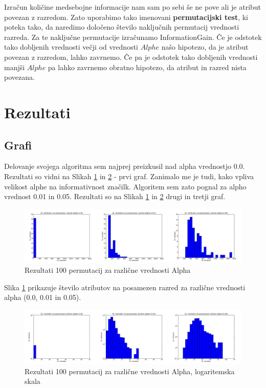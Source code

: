 \documentclass[a4paper,11pt]{article}
\begin{document}
Izračun količine medsebojne informacije nam sam po sebi še ne pove ali je atribut povezan z razredom. Zato uporabimo tako imenovani \textbf{permutacijski test}, ki poteka tako, da naredimo določeno število naključnih permutacij vrednosti razreda. Za te naključne permutacije izračunamo InformationGain. Če je odstotek tako dobljenih vrednosti večji od vrednosti $Alphe$ našo hipotezo, da je atribut povezan z razredom, lahko zavrnemo. Če pa je odstotek tako dobljenih vrednosti manjši $Alphe$ pa lahko zavrnemo obratno hipotezo, da atribut in razred nista povezana. 
\section{Rezultati}
\subsection{Grafi}

Delovanje svojega algoritma sem najprej preizkusil nad alpha vrednostjo 0.0. Rezultati so vidni na Slikah \ref{skupno100} in \ref{skupno100a} - prvi graf. Zanimalo me je tudi, kako vpliva velikost alphe na informativnost značilk. Algoritem sem zato pognal za alpho vrednost 0.01 in 0.05. Rezultati so na Slikah \ref{skupno100} in \ref{skupno100a} drugi in tretji graf.

\begin{figure}[H]
\begin{center}
\includegraphics[scale=0.2]{skupno100.png}
\caption{Rezultati 100 permutacij za različne vrednosti Alpha}
\label{skupno100}
\end{center}
\end{figure}
Slika \ref{skupno100} prikazuje število atributov na posamezen razred za različne vrednosti alpha (0.0, 0.01 in 0.05).   
\begin{figure}[H]
\begin{center}
\includegraphics[scale=0.2]{skuptnoAttr100-log.png}
\caption{Rezultati 100 permutacij za različne vrednosti Alpha, logaritemska skala}
\label{skupno100a}
\end{center}
\end{figure}
\end{document}
